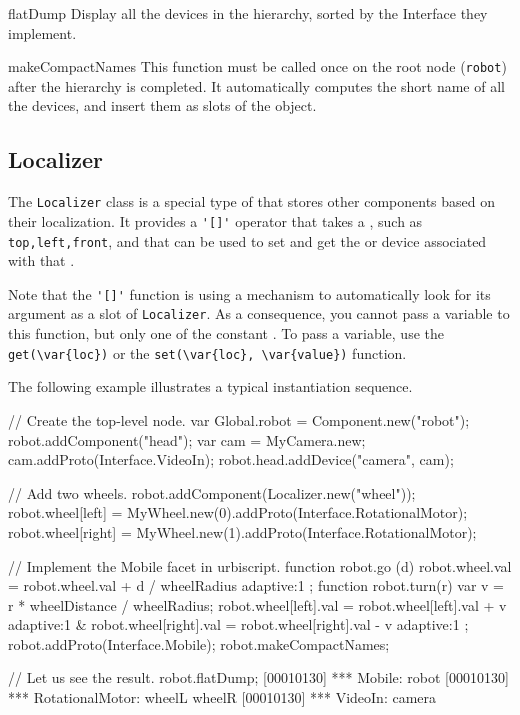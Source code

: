 {\begin{urbiscriptapi}
\item[flatDump]%
  Display all the devices in the hierarchy, sorted by the Interface
  they implement.


\item[makeCompactNames]%
  This function must be called once on the root node (\lstinline{robot})
  after the hierarchy is completed.  It automatically computes the short
  name of all the devices, and insert them as slots of the
   object.
\end{urbiscriptapi}

\subsection{Localizer}

The \lstinline{Localizer} class is a special type of 
that stores other components based on their localization. It provides a
\lstinline{'[]'} operator that takes a , such as
\lstinline|top,left,front|, and that can be used to set and get the
 or device associated with that
.

Note that the \lstinline{'[]'} function is using a mechanism to
automatically look for its argument as a slot of \lstinline{Localizer}. As a
consequence, you cannot pass a variable to this function, but only one of
the constant .  To pass a variable, use the
\lstinline|get(\var{loc})| or the \lstinline|set(\var{loc}, \var{value})|
function.

The following example illustrates a typical instantiation sequence.

\begin{urbiunchecked}
// Create the top-level node.
var Global.robot = Component.new("robot");
robot.addComponent("head");
var cam = MyCamera.new;
cam.addProto(Interface.VideoIn);
robot.head.addDevice("camera", cam);

// Add two wheels.
robot.addComponent(Localizer.new("wheel"));
robot.wheel[left] = MyWheel.new(0).addProto(Interface.RotationalMotor);
robot.wheel[right] = MyWheel.new(1).addProto(Interface.RotationalMotor);

// Implement the Mobile facet in urbiscript.
function robot.go (d)
{
  robot.wheel.val = robot.wheel.val + d / wheelRadius adaptive:1
};
function robot.turn(r)
{
  var v = r * wheelDistance / wheelRadius;
  robot.wheel[left].val = robot.wheel[left].val + v adaptive:1 &
  robot.wheel[right].val = robot.wheel[right].val - v adaptive:1
};
robot.addProto(Interface.Mobile);
robot.makeCompactNames;

// Let us see the result.
robot.flatDump;
[00010130] *** Mobile: robot
[00010130] *** RotationalMotor: wheelL wheelR
[00010130] *** VideoIn: camera
\end{urbiunchecked}

}

